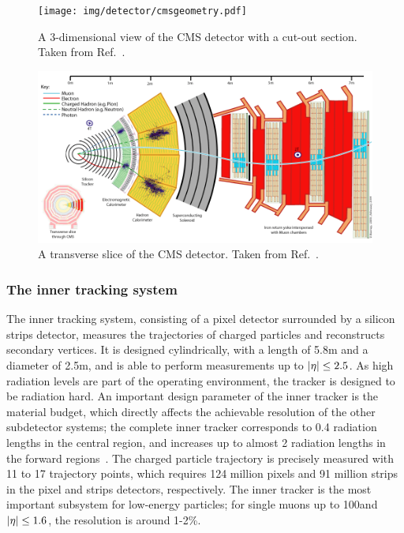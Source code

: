 \begin{figure}[hbtp]
  \begin{center}
    \texttt{[image: img/detector/cmsgeometry.pdf]}
    \caption{
        A 3-dimensional view of the CMS detector with a cut-out section.
        Taken from Ref.~\cite{Sakuma:2013jqa}.
        }
    \label{fig:cmsgeometry}
  \end{center}
\end{figure}


\begin{figure}[hbtp]
  \begin{center}
    \includegraphics[width=\linewidth]{img/detector/cmsslice.png}
    \caption{
        A transverse slice of the CMS detector.
        Taken from Ref.~\cite{cmsslice}.
        }
    \label{fig:cmsslice}
  \end{center}
\end{figure}


\subsubsection{The inner tracking system}

The inner tracking system, consisting of a pixel detector surrounded by a silicon strips detector, measures the trajectories of charged particles and reconstructs secondary vertices.
% 
It is designed cylindrically, with a length of 5.8\unit{m} and a diameter of 2.5\unit{m}, and is able to perform measurements up to $\left| \eta \right | \leq 2.5$.
% 
As high radiation levels are part of the operating environment, the tracker is designed to be radiation hard.
%
An important design parameter of the inner tracker is the material budget, which directly affects the achievable resolution of the other subdetector systems; the complete inner tracker corresponds to 0.4 radiation lengths in the central region, and increases up to almost 2 radiation lengths in the forward regions~\cite{Chatrchyan:2008zzk}.
% 
The charged particle trajectory is precisely measured with 11 to 17 trajectory points, which requires 124 million pixels and 91 million strips in the pixel and strips detectors, respectively.
% 
The inner tracker is the most important subsystem for low-energy particles; for single muons up to 100\GeV and $\left| \eta \right | \leq 1.6$, the \pt resolution is around 1-2\%.


